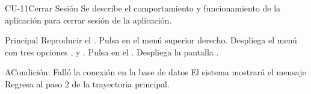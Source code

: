\begin{UseCase}{CU-11}{Cerrar Sesión}{
	Se describe el comportamiento y funcionamiento de la aplicación para cerrar sesión de la aplicación.
}
	\end{UseCase}
	\begin{UCtrayectoria}{Principal}
		\UCpaso Reproducir el .
		\UCpaso[\UCactor] Pulsa en el menú superior derecho.
		\UCpaso[\UCsist] Despliega el menú con tres opciones , y .
		\UCpaso[\UCactor] Pulsa en el  .
		\UCpaso[\UCsist] Despliega la pantalla .
	\end{UCtrayectoria}
	\begin{UCtrayectoriaA}{A}{Condición: Falló la conexión en la base de datos}
		\UCpaso[\UCsist] El sistema mostrará el mensaje 
		\UCpaso[\UCsist] Regresa al paso 2 de la trayectoria principal. 
	\end{UCtrayectoriaA}

